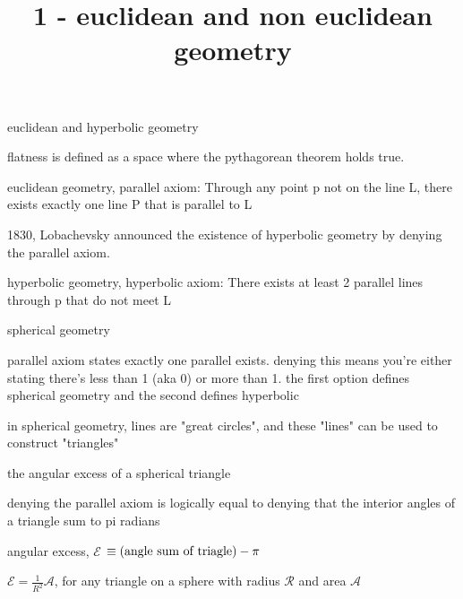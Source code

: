 \documentclass{article}
\title{1 - euclidean and non euclidean geometry}
\newenvironment{andrew_section}[1]
    {
    \section{#1}
    \begin{itemize}
    }
    {
    \end{itemize}
    }
\begin{document}
\maketitle

\begin{andrew_section}{euclidean and hyperbolic geometry}
    \item flatness is defined as a space where the pythagorean theorem holds true.
    \item 
        euclidean geometry, parallel axiom: Through any point p not 
        on the line L, there exists exactly one line P that is parallel
        to L
    \item 
        1830, Lobachevsky announced the existence of hyperbolic geometry 
        by denying the parallel axiom.
    \item 
        hyperbolic geometry, hyperbolic axiom: There exists at least 2
        parallel lines through p that do not meet L
\end{andrew_section}

\begin{andrew_section}{spherical geometry}
    \item 
        parallel axiom states exactly one parallel exists.  denying 
        this means you're either stating there's less than 1 (aka 0) or
        more than 1.  the first option defines spherical geometry and the
        second defines hyperbolic
    \item 
        in spherical geometry, lines are "great circles", and these
        "lines" can be used to construct "triangles"
\end{andrew_section}

\begin{andrew_section}{the angular excess of a spherical triangle}
    \item 
        denying the parallel axiom is logically equal to denying
        that the interior angles of a triangle sum to pi radians
    \item  angular excess, $\mathcal{E}$ $\equiv (\textnormal{angle sum of triagle}) - \pi$ 
    \item 
        $\mathcal{E} = \frac{1}{R^2} \mathcal{A}$, for any triangle
        on a sphere with radius $\mathcal{R}$ and area $\mathcal{A}$
    
\end{andrew_section}
\end{document}
